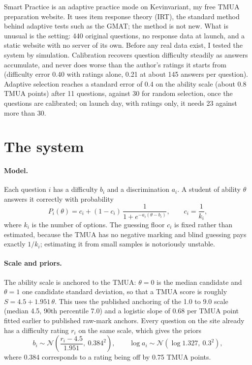 \documentclass[11pt,a4paper]{article}
\begin{document}
\begin{kvintro}
Smart Practice is an adaptive practice mode on Kevinvariant, my free TMUA preparation website. It uses item response theory (IRT), the standard method behind adaptive tests such as the GMAT; the method is not new. What is unusual is the setting: 440 original questions, no response data at launch, and a static website with no server of its own. Before any real data exist, I tested the system by simulation. Calibration recovers question difficulty steadily as answers accumulate, and never does worse than the author's ratings it starts from (difficulty error 0.40 with ratings alone, 0.21 at about 145 answers per question). Adaptive selection reaches a standard error of 0.4 on the ability scale (about 0.8 TMUA points) after 11 questions, against 30 for random selection, once the questions are calibrated; on launch day, with ratings only, it needs 23 against more than 30.
\end{kvintro}

\section{The system}

\paragraph{Model.} Each question $i$ has a difficulty $b_i$ and a discrimination $a_i$. A student of ability $\theta$ answers it correctly with probability
\begin{equation}
P_i(\theta) = c_i + (1-c_i)\,\frac{1}{1+e^{-a_i(\theta-b_i)}}, \qquad c_i = \frac{1}{k_i},
\end{equation}
where $k_i$ is the number of options. The guessing floor $c_i$ is fixed rather than estimated, because the TMUA has no negative marking and blind guessing pays exactly $1/k_i$; estimating it from small samples is notoriously unstable.

\paragraph{Scale and priors.} The ability scale is anchored to the TMUA: $\theta = 0$ is the median candidate and $\theta = 1$ one candidate standard deviation, so that a TMUA score is roughly $S = 4.5 + 1.951\,\theta$. This uses the published anchoring of the 1.0 to 9.0 scale (median 4.5, 90th percentile 7.0) and a logistic slope of 0.68 per TMUA point fitted earlier to published raw-mark anchors. Every question on the site already has a difficulty rating $r_i$ on the same scale, which gives the priors
\begin{equation}
b_i \sim \mathcal{N}\!\left(\frac{r_i - 4.5}{1.951},\ 0.384^2\right), \qquad \log a_i \sim \mathcal{N}\!\left(\log 1.327,\ 0.3^2\right),
\end{equation}
where 0.384 corresponds to a rating being off by 0.75 TMUA points.
\end{document}
